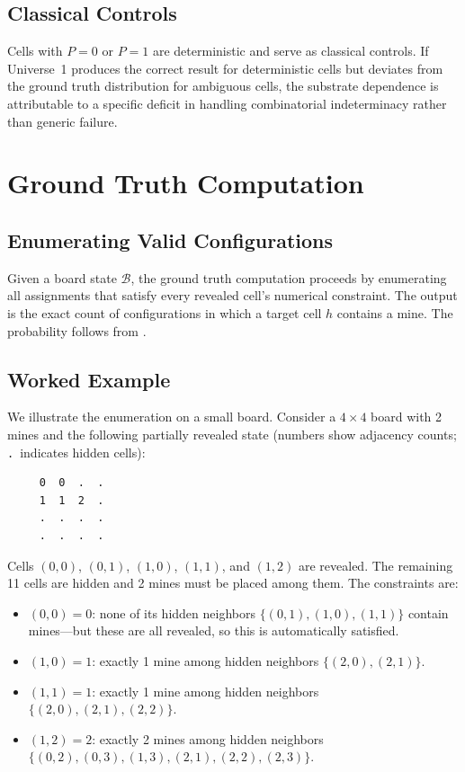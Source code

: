 \documentclass[12pt,a4paper]{article}
\begin{document}
\subsection{Classical Controls}
\label{sec:controls}

Cells with $P = 0$ or $P = 1$ are deterministic and serve as classical controls. If Universe~1 produces the correct result for deterministic cells but deviates from the ground truth distribution for ambiguous cells, the substrate dependence is attributable to a specific deficit in handling combinatorial indeterminacy rather than generic failure.

\section{Ground Truth Computation}
\label{sec:ground_truth}

\subsection{Enumerating Valid Configurations}
\label{sec:enumeration}

Given a board state $\mathcal{B}$, the ground truth computation proceeds by enumerating all assignments that satisfy every revealed cell's numerical constraint. The output is the exact count of configurations in which a target cell $h$ contains a mine. The probability follows from .

\subsection{Worked Example}
\label{sec:worked_example}

We illustrate the enumeration on a small board. Consider a $4 \times 4$ board with 2 mines and the following partially revealed state (numbers show adjacency counts; \texttt{.}~indicates hidden cells):

\begin{verbatim}
     0  0  .  .
     1  1  2  .
     .  .  .  .
     .  .  .  .
\end{verbatim}

\noindent
Cells $(0{,}0)$, $(0{,}1)$, $(1{,}0)$, $(1{,}1)$, and $(1{,}2)$ are revealed. The remaining 11 cells are hidden and 2 mines must be placed among them. The constraints are:

\begin{itemize}[nosep]
    \item $(0{,}0) = 0$: none of its hidden neighbors $\{(0{,}1), (1{,}0), (1{,}1)\}$ contain mines---but these are all revealed, so this is automatically satisfied.
    \item $(1{,}0) = 1$: exactly 1 mine among hidden neighbors $\{(2{,}0), (2{,}1)\}$.
    \item $(1{,}1) = 1$: exactly 1 mine among hidden neighbors $\{(2{,}0), (2{,}1), (2{,}2)\}$.
    \item $(1{,}2) = 2$: exactly 2 mines among hidden neighbors $\{(0{,}2), (0{,}3), (1{,}3), (2{,}1), (2{,}2), (2{,}3)\}$.
\end{itemize}
\end{document}
